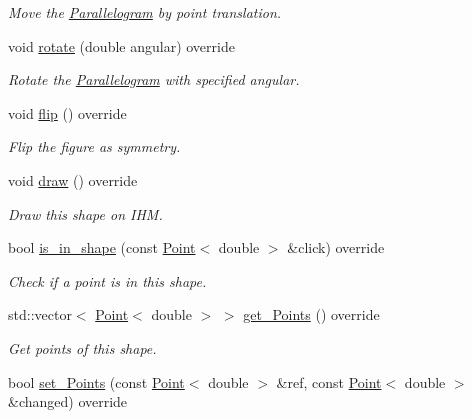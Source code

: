 \begin{DoxyCompactItemize}
\begin{DoxyCompactList}\small\item\em Move the \hyperlink{classParallelogram}{Parallelogram} by point translation. \end{DoxyCompactList}\item 
void \hyperlink{classParallelogram_ac498f6a15dea236ecc49bece023d17b0}{rotate} (double angular) override
\begin{DoxyCompactList}\small\item\em Rotate the \hyperlink{classParallelogram}{Parallelogram} with specified angular. \end{DoxyCompactList}\item 
\mbox{\label{classParallelogram_a51f002e90b7bf6c5d875cc094c22f7c1}} 
void \hyperlink{classParallelogram_a51f002e90b7bf6c5d875cc094c22f7c1}{flip} () override
\begin{DoxyCompactList}\small\item\em Flip the figure as symmetry. \end{DoxyCompactList}\item 
\mbox{\label{classParallelogram_a73e3657bf024787b57ccdd8035a6fdef}} 
void \hyperlink{classParallelogram_a73e3657bf024787b57ccdd8035a6fdef}{draw} () override
\begin{DoxyCompactList}\small\item\em Draw this shape on I\+HM. \end{DoxyCompactList}\item 
bool \hyperlink{classParallelogram_a585b14ca0f65ed3a5007e8c1df3c6bc4}{is\+\_\+in\+\_\+shape} (const \hyperlink{classPoint}{Point}$<$ double $>$ \&click) override
\begin{DoxyCompactList}\small\item\em Check if a point is in this shape. \end{DoxyCompactList}\item 
std\+::vector$<$ \hyperlink{classPoint}{Point}$<$ double $>$ $>$ \hyperlink{classParallelogram_a17c9986712806a8b07d90e444e0a543d}{get\+\_\+\+Points} () override
\begin{DoxyCompactList}\small\item\em Get points of this shape. \end{DoxyCompactList}\item 
bool \hyperlink{classParallelogram_ab74583703a60e4b798d7048aa684f44e}{set\+\_\+\+Points} (const \hyperlink{classPoint}{Point}$<$ double $>$ \&ref, const \hyperlink{classPoint}{Point}$<$ double $>$ \&changed) override

\end{DoxyCompactItemize}
